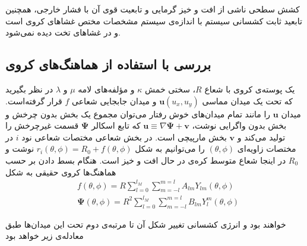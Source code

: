 کشش سطحی ناشی از افت و خیز گرمایی و تابعیت قوی آن با فشار خارجی، همچنین تابعید ثابت کشسانی سیستم با اندازه‌ی سیستم مشخصات مختص غشاهای کروی است و در غشا‌های تخت دیده نمی‌شود. 
\subsection{بررسی با استفاده از هماهنگ‌های کروی}
یک پوسته‌ی کروی با شعاع $R$، سختی خمش $\kappa$ و مؤلفه‌های لامه $\mu$ و $\lambda$ 
در نظر بگیرید که تحت یک میدان مماسی $\boldsymbol u(u_x,u_y)$
و میدان جابجایی شعاعی $f$
قرار گرفته‌است. میدان $\boldsymbol u$
را مانند تمام میدان‌های خوش رفتار می‌توان مجموع یک بخش بدون چرخش
و بخش بدون واگرایی
نوشت، $\boldsymbol u\equiv\nabla\boldsymbol\Psi+\boldsymbol v$ که تابع اسکالر $\boldsymbol\Psi$ قسمت غیرچرخش
 را تولید می‌کند و $\boldsymbol v$ بخش مارپیچی
 است. در بخش شعاعی مختصات شعاعی نود $i$ 
 در مختصات زاویه‌ای $(\theta,\phi)$ را می‌توانیم به شکل $r_i(\theta,\phi)=R_0+f(\theta,\phi)$
 نوشت و $R_0$ در اینجا شعاع متوسط کره‌ی در حال افت و خیز است.
 هنگام بسط دادن بر حسب هماهنگ‌ها کروی حقیقی به شکل
\begin{equation}
\begin{aligned}
&f(\theta,\phi)=R\sum_{l=0}^{l_M}\sum_{m=-l}^{m=l}A_{lm}Y_{lm}(\theta,\phi)\\
&\boldsymbol\Psi(\theta,\phi)=R^2\sum_{l=0}^{l_M}\sum_{m=-l}^{m=l}B_{lm}Y_l^m(\theta,\phi)
\label{eq:nelsonS28.1}
\end{aligned}
\end{equation} 

خواهند بود و انرژی کشسانی تغییر شکل آن تا مرتبه‌ی دوم تحت این میدان‌ها طبق معادله‌ی زیر خواهد بود \cite{krollPRE1993}

